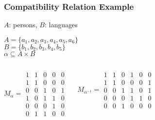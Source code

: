 \documentclass[dvipsnames]{beamer}
\begin{document}
\begin{frame}
  \frametitle{Compatibility Relation Example}

  \begin{example}
    $A$: persons, $B$: languages

    \medskip
    $A=\{a_1,a_2,a_3,a_4,a_5,a_6\}$\\
    $B=\{b_1,b_2,b_3,b_4,b_5\}$\\
    $\alpha \subseteq A \times B$

    \pause
    \begin{columns}
      \[
        M_\alpha =
          \begin{array}{|ccccc|}
            1  &  1  &  0  &  0  &  0\\
            1  &  1  &  0  &  0  &  0\\
            0  &  0  &  1  &  0  &  1\\
            1  &  0  &  1  &  1  &  0\\
            0  &  0  &  0  &  1  &  0\\
            0  &  1  &  1  &  0  &  0
          \end{array}
      \]

      \[
        M_{\alpha^{-1}} =
          \begin{array}{|cccccc|}
            1  &  1  &  0  &  1  &  0  &  0\\
            1  &  1  &  0  &  0  &  0  &  1\\
            0  &  0  &  1  &  1  &  0  &  1\\
            0  &  0  &  0  &  1  &  1  &  0\\
            0  &  0  &  1  &  0  &  0  &  0
          \end{array}
      \]
    \end{columns}
  \end{example}
\end{frame}
\end{document}
